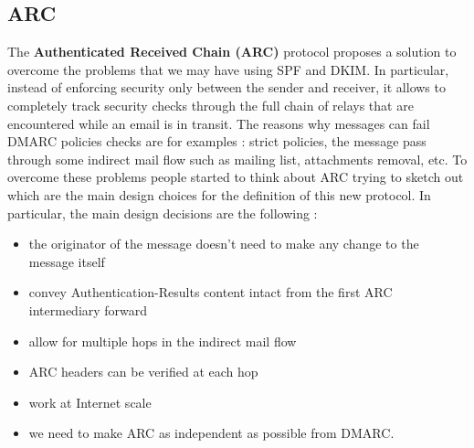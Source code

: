 \subsection{ARC}
The \textbf{Authenticated Received Chain (ARC)} protocol proposes a solution to overcome the problems that we may have using SPF and DKIM. In particular, instead of enforcing security only between the sender and receiver, it allows to completely track security checks through the full chain of relays that are encountered while an email is in transit. The reasons why messages can fail DMARC policies checks are for examples : strict policies, the message pass through some indirect mail flow such as mailing list, attachments removal, etc. To overcome these problems people started to think about ARC trying to sketch out which are the main design choices for the definition of this new protocol. In particular, the main design decisions are the following :
\begin{itemize}
\item the originator of the message doesn't need to make any change to the message itself
\item convey Authentication-Results content intact from the first ARC intermediary forward
\item allow for multiple hops in the indirect mail flow
\item ARC headers can be verified at each hop
\item work at Internet scale
\item we need to make ARC as independent as possible from DMARC.
\end{itemize}
